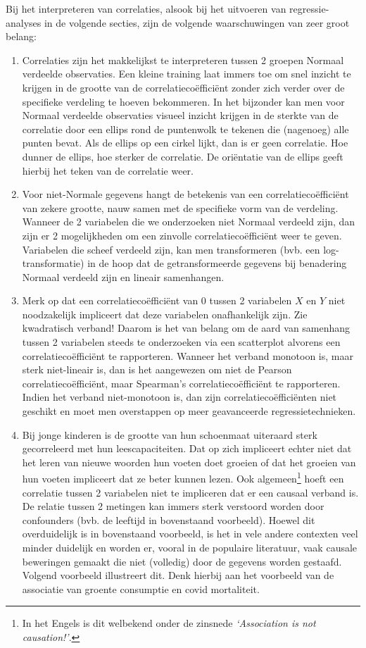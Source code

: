 \documentclass[
  12pt,dutch,coursenotes]{book}
\theoremstyle{definition}
\theoremstyle{definition}
\theoremstyle{definition}
\theoremstyle{remark}
\begin{document}
Bij het interpreteren van correlaties, alsook bij het uitvoeren van
regressie-analyses in de volgende secties, zijn de volgende waarschuwingen
van zeer groot belang:

\begin{enumerate}
\def\labelenumi{\arabic{enumi}.}
\item
  Correlaties zijn het makkelijkst te interpreteren tussen 2 groepen Normaal verdeelde observaties. Een kleine training laat immers toe om snel inzicht te krijgen in de grootte van de correlatiecoëfficiënt zonder zich verder over de specifieke verdeling te hoeven bekommeren. In het bijzonder kan men voor Normaal verdeelde observaties visueel inzicht krijgen in de sterkte van de correlatie door een ellips rond de puntenwolk te tekenen die (nagenoeg) alle punten bevat. Als de ellips op een cirkel lijkt, dan is er geen correlatie. Hoe dunner de ellips, hoe sterker de correlatie. De oriëntatie van de ellips geeft hierbij het teken van de correlatie weer.
\item
  Voor niet-Normale gegevens hangt de betekenis van een correlatiecoëfficiënt van zekere grootte, nauw samen met de specifieke vorm van de verdeling. Wanneer de 2 variabelen die we onderzoeken niet Normaal verdeeld zijn, dan zijn er 2 mogelijkheden om een zinvolle correlatiecoëfficiënt weer te geven. Variabelen die scheef verdeeld zijn, kan men transformeren (bvb. een log-transformatie) in de hoop dat de getransformeerde gegevens bij benadering Normaal verdeeld zijn en lineair samenhangen.
\item
  Merk op dat een correlatiecoëfficiënt van 0 tussen 2 variabelen \(X\) en \(Y\) niet noodzakelijk impliceert dat deze variabelen onafhankelijk zijn. Zie kwadratisch verband! Daarom is het van belang om de aard van samenhang tussen 2 variabelen steeds te onderzoeken via een scatterplot alvorens een correlatiecoëfficiënt te rapporteren. Wanneer het verband monotoon is, maar sterk niet-lineair is, dan is het aangewezen om niet de Pearson correlatiecoëfficiënt, maar Spearman's correlatiecoëfficiënt te rapporteren. Indien het verband niet-monotoon is, dan zijn correlatiecoëfficiënten niet geschikt en moet men overstappen op meer geavanceerde regressietechnieken.
\item
  Bij jonge kinderen is de grootte van hun schoenmaat uiteraard sterk gecorreleerd met hun leescapaciteiten. Dat op zich impliceert echter niet dat het leren van nieuwe woorden hun voeten doet groeien of dat het groeien van hun voeten impliceert dat ze beter kunnen lezen. Ook algemeen\footnote{In het Engels is dit welbekend onder de zinsnede \emph{`Association is not causation!'}.} hoeft een correlatie tussen 2 variabelen niet te impliceren dat er een causaal verband is. De relatie tussen 2 metingen kan immers sterk verstoord worden door confounders (bvb. de leeftijd in bovenstaand voorbeeld). Hoewel dit overduidelijk is in bovenstaand voorbeeld, is het in vele andere contexten veel minder duidelijk en worden er, vooral in de populaire literatuur, vaak causale beweringen gemaakt die niet (volledig) door de gegevens worden gestaafd. Volgend voorbeeld illustreert dit. Denk hierbij aan het voorbeeld van de associatie van groente consumptie en covid mortaliteit.

\end{enumerate}
\end{document}
